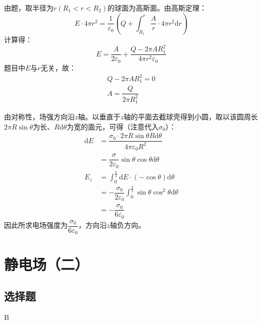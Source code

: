 \documentclass[b5paper,opensource,sourcefont,parskip]{qyxf-book}
\newcommand{\di}[1]{\mathrm{d}#1}
\begin{document}

\solve
由题，取半径为$r(R_1<r<R_2)$的球面为高斯面。由高斯定理：
\begin{equation*}
	E\cdot 4\pi r^2=\dfrac{1}{\varepsilon_0}(Q+\int_{R_1}^r\dfrac{A}{r}\cdot 4\pi r^2\di{r})
\end{equation*}
计算得：
\begin{equation*}
	E=\dfrac{A}{2\varepsilon_0}+\dfrac{Q-2\pi AR_1^2}{4\pi r^2\varepsilon_0}
\end{equation*}
题目中$E$与$r$无关，故：
\begin{gather*}
	Q-2\pi AR_1^2=0\\
	A=\dfrac{Q}{2\pi R_1^2}
\end{gather*}



\solve
由对称性，场强方向沿$z$轴。以垂直于$z$轴的平面去截球壳得到小圆，取以该圆周长$2\pi R\sin\theta$为长、$R\di{\theta}$为宽的面元，可得（注意代入$\sigma_0$）：
\begin{align*}
	\di{E}&=\dfrac{\sigma_0\cdot 2\pi R\sin \theta R\di{\theta}}{4\pi \varepsilon_0 R^2}\\
	&=\dfrac{\sigma}{2\varepsilon_0}\sin\theta\cos\theta\di{\theta}\\
	E_z&=\int_0^{\frac{\pi}{2}}\di{E}\cdot(-\cos\theta)\di{\theta}\\
	&=-\dfrac{\sigma_0}{2\varepsilon_0}\int_0^{\frac{\pi}{2}}\sin\theta\cos^2\theta\di{\theta}\\
	&=-\dfrac{\sigma_0}{6\varepsilon_0}
\end{align*}
因此所求电场强度为$\dfrac{\sigma_0}{6\varepsilon_0}$，方向沿$z$轴负方向。

\chapter{静电场（二）}  %
\section{选择题}  %

B  %
\end{document}
